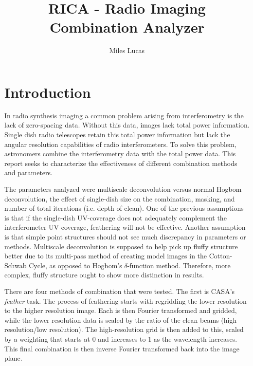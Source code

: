 \documentclass[manuscript,linenumbers]{aastex62}
\begin{document}
\title{RICA - Radio Imaging Combination Analyzer}
\author{Miles Lucas}
 

\begin{abstract}

\end{abstract}


\section{Introduction}

In radio synthesis imaging a common problem arising from interferometry is the lack of zero-spacing data. Without this data, images lack total power information. Single dish radio telescopes retain this total power information but lack the angular resolution capabilities of radio interferometers. To solve this problem, astronomers combine the interferometry data with the total power data. This report seeks to characterize the effectiveness of different combination methods and parameters.

The parameters analyzed were multiscale deconvolution versus normal Hogbom deconvolution, the effect of single-dish size on the combination, masking, and number of total iterations (i.e. depth of clean). One of the previous assumptions is that if the single-dish UV-coverage does not adequately complement the interferometer UV-coverage, feathering will not be effective. Another assumption is that simple point structures should not see much discrepancy in parameters or methods. Multiscale deconvolution is supposed to help pick up fluffy structure better due to its multi-pass method of creating model images in the Cotton-Schwab Cycle, as opposed to Hogbom's $\delta$-function method. Therefore, more complex, fluffy structure ought to show more distinction in results.

There are four methods of combination that were tested. The first is CASA's \textit{feather} task. The process of feathering starts with regridding the lower resolution to the higher resolution image. Each is then Fourier transformed and gridded, while the lower resolution data is scaled by the ratio of the clean beams (high resolution/low resolution). The high-resolution grid is then added to this, scaled by a weighting that starts at 0 and increases to 1 as the wavelength increases. This final combination is then inverse Fourier transformed back into the image plane. 
\end{document}
